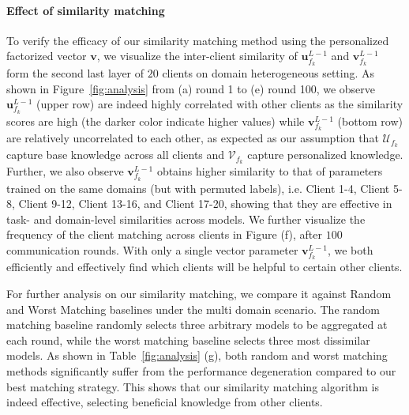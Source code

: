 \paragraph{Effect of similarity matching} 
To verify the efficacy of our similarity matching method using the personalized factorized vector $\textbf{v}$, we visualize the inter-client similarity of $\textbf{u}^{L-1}_{f_k}$ and $\textbf{v}^{L-1}_{f_k}$ form the second last layer of $20$ clients  on domain heterogeneous setting. As shown in Figure~\ref{fig:analysis} from (a) round 1 to (e) round 100, we observe $\textbf{u}^{L-1}_{f_k}$ (upper row) are indeed highly correlated with other clients as the similarity scores are high (the darker color indicate higher values) while $\textbf{v}^{L-1}_{f_k}$ (bottom row) are relatively uncorrelated to each other, as expected as our assumption that $\mathcal{U}_{f_k}$ capture base knowledge across all clients and $\mathcal{V}_{f_k}$ capture personalized knowledge. Further, we also observe $\textbf{v}^{L-1}_{f_k}$ obtains higher similarity to that of parameters trained on the same domains (but with permuted labels), i.e. Client 1-4, Client 5-8, Client 9-12, Client 13-16, and Client 17-20, showing that they are effective in task- and domain-level similarities across models. We further visualize the frequency of the client matching across clients in Figure (f), after $100$ communication rounds. With only a single vector parameter $\textbf{v}^{L-1}_{f_k}$, we both efficiently and effectively find which clients will be helpful to certain other clients. 

For further analysis on our similarity matching, we compare it against Random and Worst Matching baselines under the multi domain scenario. The random matching baseline randomly selects three arbitrary models to be aggregated at each round, while the worst matching baseline selects three most dissimilar models. As shown in Table~\ref{fig:analysis} (g), both random and worst matching methods significantly suffer from the performance degeneration compared to our best matching strategy. This shows that our similarity matching algorithm is indeed effective, selecting beneficial knowledge from other clients. 








